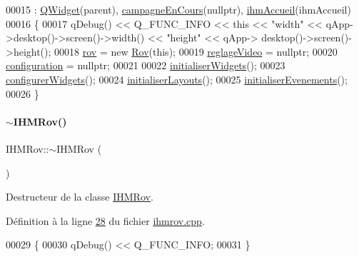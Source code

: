 \begin{DoxyCode}
00015                                                       : \hyperlink{class_q_widget}{QWidget}(parent), 
      \hyperlink{class_i_h_m_rov_af0475e935531b7331f097ae13d07989b}{campagneEnCours}(\textcolor{keyword}{nullptr}), \hyperlink{class_i_h_m_rov_aa22f6fe8daf5c67071ec02a348e5cc3e}{ihmAccueil}(ihmAccueil)
00016 \{    
00017     qDebug() << Q\_FUNC\_INFO << \textcolor{keyword}{this} << \textcolor{stringliteral}{"width"} << qApp->desktop()->screen()->width() << \textcolor{stringliteral}{"height"} << qApp->
      desktop()->screen()->height();
00018     \hyperlink{class_i_h_m_rov_a777ca33fdb295ba6b6773e880356fa1e}{rov} = \textcolor{keyword}{new} \hyperlink{class_rov}{Rov}(\textcolor{keyword}{this});
00019     \hyperlink{class_i_h_m_rov_a6baa53853d29151404e6ae3dec5d2003}{reglageVideo} = \textcolor{keyword}{nullptr};
00020     \hyperlink{class_i_h_m_rov_a29f4de081899d8830376f1ad27e74647}{configuration} = \textcolor{keyword}{nullptr};
00021 
00022     \hyperlink{class_i_h_m_rov_a77d08efdfc3292d215af4df0e1af33a8}{initialiserWidgets}();
00023     \hyperlink{class_i_h_m_rov_aba47130fb875a01eefa09bc875affe6c}{configurerWidgets}();
00024     \hyperlink{class_i_h_m_rov_aa900473297415bf43a13c4152034135a}{initialiserLayouts}();
00025     \hyperlink{class_i_h_m_rov_a61e34efc084bba9934bce0d91448ea04}{initialiserEvenements}();
00026 \}
\end{DoxyCode}
\mbox{\label{class_i_h_m_rov_ab861463889934a3b6083b7a29c6adf45}} 
\paragraph{\texorpdfstring{$\sim$\+I\+H\+M\+Rov()}{~IHMRov()}}
{\footnotesize\ttfamily I\+H\+M\+Rov\+::$\sim$\+I\+H\+M\+Rov (\begin{DoxyParamCaption}{ }\end{DoxyParamCaption})}



Destructeur de la classe \hyperlink{class_i_h_m_rov}{I\+H\+M\+Rov}. 



Définition à la ligne \hyperlink{ihmrov_8cpp_source_l00028}{28} du fichier \hyperlink{ihmrov_8cpp_source}{ihmrov.\+cpp}.


\begin{DoxyCode}
00029 \{
00030     qDebug() << Q\_FUNC\_INFO;
00031 \}
\end{DoxyCode}


